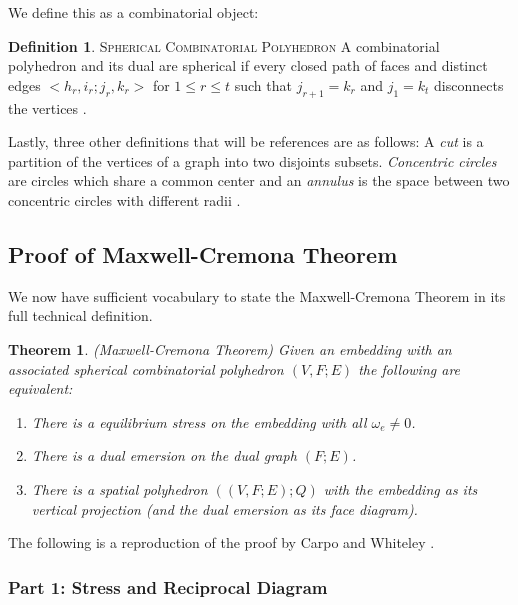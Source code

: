 \documentclass[11pt]{article}
\newtheorem{theorem}{Theorem}[section]
\theoremstyle{definition}
\newtheorem{definition}{Definition}[section]
\begin{document}
	We define this as a combinatorial object:
	
	\theoremstyle{definition}
	\begin{definition}{\textsc{Spherical Combinatorial Polyhedron}}
		A combinatorial polyhedron and its dual are spherical if every closed path of faces and distinct edges $<h_r,i_r;j_r,k_r>$ for $1 \leq r \leq t$ such that $j_{r+1} = k_r$ and $j_1 = k_t$ disconnects the vertices \cite{mccProof}.
	\end{definition}
		
	Lastly, three other definitions that will be references are as follows:
	A \emph{cut} is a partition of the vertices of a graph into two disjoints subsets. 
	\emph{Concentric circles} are circles which share a common center and an \emph{annulus} is the space between two concentric circles with different radii \cite{mathworld:ConcentricCircles}.
	
\subsection{Proof of Maxwell-Cremona Theorem}
	We now have sufficient vocabulary to state the Maxwell-Cremona Theorem in its full technical definition.
	
	\begin{theorem}{(Maxwell-Cremona Theorem)} 
	Given an embedding with an associated spherical combinatorial polyhedron $(V,F;E)$ the following are equivalent:
		\begin{enumerate}
			\item There is a equilibrium stress on the embedding with all $\omega_e \neq 0$.
			\item There is a dual emersion on the dual graph $(F;E)$.
			\item There is a spatial polyhedron $((V,F;E);Q)$ with the embedding as its vertical projection (and the dual emersion as its face diagram).
 		\end{enumerate}
	\end{theorem}
	
	The following is a reproduction of the proof by Carpo and Whiteley \cite{mccProof}.
	
\subsubsection{Part 1: Stress and Reciprocal Diagram}
	
\end{document}
